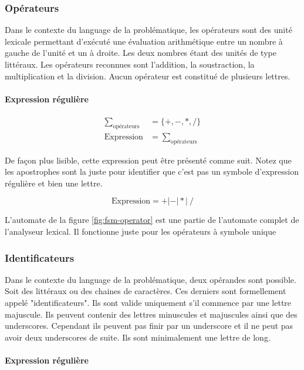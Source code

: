 \subsubsection{Opérateurs}

Dans le contexte du language de la problématique, les opérateurs sont des
unité lexicale permettant d'exécuté une évaluation arithmétique entre un
nombre à gauche de l'unité et un à droite. Les deux nombres étant des unités
de type littéraux. Les opérateurs reconnues sont l'addition, la soustraction,
la multiplication et la division. Aucun opérateur est constitué de plusieurs
lettres.

\paragraph{Expression régulière}

\begin{align}
  \sum_{\textrm{opérateurs}} &= \{+,-,*,/\} \\
  \textrm{Expression} &= \sum_{\textrm{opérateurs}}
\end{align}

De façon plus lisible, cette expression peut être présenté comme suit. Notez
que les apostrophes sont la juste pour identifier que c'est pas un symbole
d'expression régulière et bien une lettre.

\begin{equation}
  \textrm{Expression} = +|-|*|\ /
\end{equation}

L'automate de la figure \ref{fig:fsm-operator} est une partie de l'automate
complet de l'analyseur lexical. Il fonctionne juste pour les opérateurs à
symbole unique


\subsubsection{Identificateurs}

Dans le contexte du language de la problématique, deux opérandes sont
possible. Soit des littéraux ou des chaines de caractères. Ces derniers sont
formellement appelé "identificateurs". Ils sont valide uniquement s'il
commence par une lettre majuscule. Ils peuvent contenir des lettres
minuscules et majuscules ainsi que des underscores. Cependant ils peuvent pas
finir par un underscore et il ne peut pas avoir deux underscores de suite.
Ils sont minimalement une lettre de long.

\paragraph{Expression régulière}

